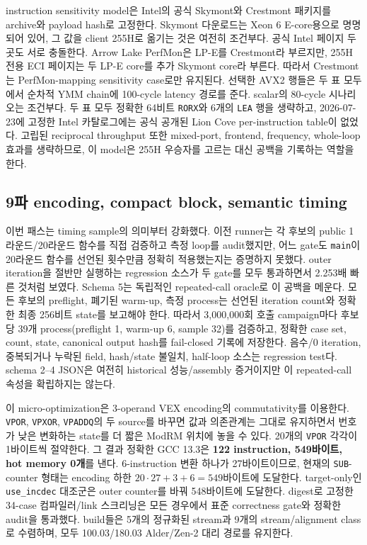 \documentclass[11pt,a4paper]{article}
\begin{document}
instruction sensitivity model은 Intel의 공식 Skymont와
Crestmont 패키지를 archive와 payload hash로 고정한다.  Skymont
다운로드는 Xeon 6 E-core용으로 명명되어 있어, 그 값을 client 255H로
옮기는 것은 여전히 조건부다.  공식 Intel 페이지 두 곳도 서로
충돌한다. Arrow Lake PerfMon은 LP-E를 Crestmont라 부르지만, 255H
전용 ECI 페이지는 두 LP-E core를 추가 Skymont core라 부른다.
따라서 Crestmont는 PerfMon-mapping sensitivity case로만 유지된다.
선택한 AVX2 행들은 두 표 모두에서 순차적 YMM chain에 100-cycle latency
경로를 준다.  scalar의 80-cycle 시나리오는 조건부다. 두 표 모두 정확한
64비트 \texttt{RORX}와 6개의 \texttt{LEA} 행을 생략하고, 2026-07-23에
고정한 Intel 카탈로그에는 공식 공개된 Lion Cove per-instruction
table이 없었다.  고립된 reciprocal throughput 또한 mixed-port,
frontend, frequency, whole-loop 효과를 생략하므로, 이 model은 255H
우승자를 고르는 대신 공백을 기록하는 역할을 한다.

\subsection{9파 encoding, compact block, semantic timing}

이번 패스는 timing sample의 의미부터 강화했다.  이전
runner는 각 후보의 public 1라운드/20라운드 함수를 직접 검증하고 측정
loop를 audit했지만, 어느 gate도 \texttt{main}이 20라운드 함수를 선언된
횟수만큼 정확히 적용했는지는 증명하지 못했다.  outer iteration을
절반만 실행하는 regression 소스가 두 gate를 모두 통과하면서 2.253배
빠른 것처럼 보였다.  Schema 5는 독립적인 repeated-call oracle로 이
공백을 메운다.  모든 후보의 preflight, 폐기된 warm-up, 측정 process는
선언된 iteration count와 정확한 최종 256비트 state를 보고해야 한다.
따라서 3,000,000회 호출 campaign마다 후보당 39개 process(preflight 1,
warm-up 6, sample 32)를 검증하고, 정확한 case set, count, state,
canonical output hash를 fail-closed 기록에 저장한다.  음수/0 iteration,
중복되거나 누락된 field, hash/state 불일치, half-loop 소스는 regression
test다.  schema 2--4 JSON은 여전히 historical 성능/assembly 증거이지만
이 repeated-call 속성을 확립하지는 않는다.

이 micro-optimization은 3-operand VEX encoding의 commutativity를
이용한다.  \texttt{VPOR}, \texttt{VPXOR}, \texttt{VPADDQ}의 두 source를
바꾸면 값과 의존관계는 그대로 유지하면서 번호가 낮은 변화하는 state를
더 짧은 ModRM 위치에 놓을 수 있다.  20개의 \texttt{VPOR} 각각이 1바이트씩
절약한다.  그 결과 정확한 GCC 13.3은 \textbf{122 instruction, 549바이트,
hot memory 0개}를 낸다.  6-instruction 변환 하나가 27바이트이므로,
현재의 \texttt{SUB}-counter 형태는 encoding 하한
$20\mathbin{\cdot}27+3+6=549$바이트에 도달한다.  target-only인
\texttt{use\_incdec} 대조군은 outer counter를 바꿔 548바이트에
도달한다.  digest로 고정한 34-case 컴파일러/link 스크리닝은 모든
경우에서 표준 correctness gate와 정확한 audit을 통과했다.  build들은
5개의 정규화된 stream과 9개의 stream/alignment class로 수렴하며, 모두
100.03/180.03 Alder/Zen-2 대리 경로를 유지한다.
\end{document}
